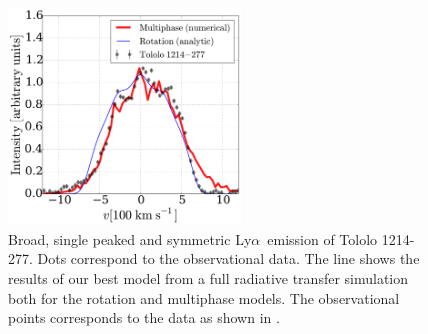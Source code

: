 \documentclass[a4,useAMS,usenatbib,usegraphicx]{mn2e}
\newcommand{\tol}{Tololo 1214-277}
\newcommand{\lya}{Ly$\alpha$}
\begin{document}
\begin{figure}
\begin{center}
\includegraphics[width=0.55\textwidth]{CLARA-TOL-main.pdf}
\caption{Broad, single peaked and symmetric \lya\ emission of \tol.
  Dots correspond to the observational data. The line shows the results
of our best model from a full radiative transfer simulation both for
the rotation and multiphase models.
The observational points corresponds to the data as shown in
\citep{mashesse03}.}   
\end{center}
\end{figure}
\end{document}
